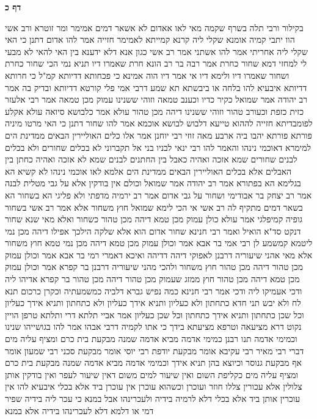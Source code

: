 \documentclass[12pt, openany]{book}
\newcommand{\sethebfont}{
\fontsize{10.5pt}{21.0pt} \selectfont
}
\newcommand{\twocol}[1]{
	{\sethebfont \begin{multicols}{2}
			#1
	\end{multicols}}	
}
\newcommand{\sectname}{}
\newcommand{\newsection}[1]{
	\addcontentsline{toc}{section}{#1}
	\renewcommand{\sectname}{#1}	
	\vspace{-\baselineskip}
	\begin{center}
		\textbf{%
\fontsize{16pt}{16pt}\selectfont
			#1}
	\end{center}
	\vspace{-\baselineskip}
	\nopagebreak
}
\begin{document}
\newsection{דף כ}
\twocol{בקילור ורבי תלה בשרף שקמה  מאי לאו אאדום 
לא אשאר דמים 
אמימר ומר זוטרא ורב אשי הוו יתבי קמיה אומנא שקלי ליה קרנא קמייתא לאמימר חזייה אמר להו  אדום דתנן כי האי  שקלי ליה אחריתי אמר להו  אשתני  אמר רב אשי  כגון אנא דלא ידענא בין האי להאי לא מבעי לי למחזי דמא
שחור כחרת אמר רבה בר רב הונא  חרת שאמרו דיו  תניא נמי הכי  שחור כחרת ושחור שאמרו דיו  ולימא דיו  אי אמר דיו הוה אמינא  כי פכחותא דדיותא קמ"ל כי חרותא דדיותא 
איבעיא להו  בלחה או ביבשתא  תא שמע  דרבי אמי פלי קורטא דדיותא ובדיק בה 
אמר רב יהודה אמר שמואל  כקיר כדיו וכענב טמאה וזוהי ששנינו עמוק מכן טמאה  אמר רבי אלעזר  כזית כזפת וכעורב טהור וזוהי ששנינו דיהה מכן טהור 
עולא אמר  כלבושא סיואה  עולא אקלע לפומבדיתא חזייה לההוא טייעא דלבוש לבושא אוכמא  אמר להו  שחור דתנן כי האי  מרטו מיניה פורתא פורתא יהבו ביה ארבע מאה זוזי 
רבי יוחנן אמר  אלו כלים האוליירין הבאים ממדינת הים  למימרא דאוכמי נינהו  והאמר להו רבי ינאי לבניו  בני אל תקברוני לא בכלים שחורים ולא בכלים לבנים  שחורים שמא אזכה ואהיה כאבל בין החתנים לבנים שמא לא אזכה ואהיה כחתן בין האבלים אלא בכלים האוליירין הבאים ממדינת הים 
אלמא לאו אוכמי נינהו  לא קשיא הא בגלימא הא בפתורא 
אמר רב יהודה אמר שמואל  וכולם אין בודקין אלא על גבי מטלית לבנה  אמר רב יצחק בר אבודימי  ושחור על גבי אדום 
אמר רב ירמיה מדפתי  ולא פליגי הא בשחור הא בשאר דמים  מתקיף לה רב אשי  אי הכי לימא שמואל חוץ משחור  אלא אמר רב אשי  בשחור גופיה קמיפלגי 
אמר עולא  כולן עמוק מכן טמא דיהה מכן טהור כשחור 
ואלא מאי שנא שחור דנקט  סד"א  הואיל ואמר רבי חנינא שחור אדום הוא אלא שלקה הילכך אפילו דיהה מכן נמי ליטמא קמשמע לן 
רבי אמי בר אבא אמר  וכולן עמוק מכן טמא דיהה מכן נמי טמא חוץ משחור  אלא מאי אהני שיעוריה דרבנן  לאפוקי דיהה דדיהה 
ואיכא דאמרי רמי בר אבא אמר  וכולן עמוק מכן טהור דיהה מכן טהור חוץ משחור  ולהכי מהני שיעוריה דרבנן 
בר קפרא אמר  וכולן עמוק מכן טמא דיהה מכן טהור  חוץ ממזג שעמוק מכן טהור דיהה מכן טהור  בר קפרא אדיהו ליה ודכי אעמיקו ליה ודכי  אמר רבי חנינא  כמה נפיש גברא דלביה כמשמעתיה
וכקרן כרכום תנא  לח ולא יבש 
תני חדא  כתחתון ולא כעליון ותניא אידך  כעליון ולא כתחתון ותניא אידך  כעליון וכל שכן כתחתון ותניא אידך  כתחתון וכל שכן כעליון 
אמר אביי  תלתא דרי ותלתא טרפן הויין
נקוט דרא מציעאה וטרפא מציעתא בידך 
כי אתו לקמיה דרבי אבהו אמר להו  בגושייהו שנינו
וכמימי אדמה תנו רבנן  כמימי אדמה מביא אדמה שמנה מבקעת בית כרם ומציף עליה מים דברי רבי מאיר  רבי עקיבא אומר  מבקעת יודפת  רבי יוסי אומר  מבקעת סכני  רבי שמעון אומר  אף מבקעת גנוסר וכיוצא בהן 
תניא אידך  וכמימי אדמה מביא אדמה שמנה מבקעת בית כרם ומציף עליה מים כקליפת השום ואין שיעור למים משום דאין שיעור לעפר  ואין בודקין אותן צלולין אלא עכורין  צללו חוזר ועוכרן  וכשהוא עוכרן אין עוכרן ביד אלא בכלי 
איבעיא להו  אין עוכרין אותן ביד אלא בכלי דלא לרמיה בידיה ולעכרינהו אבל במנא כי עכר ליה בידיה שפיר דמי או דלמא  דלא לעכרינהו בידיה אלא במנא 
}
\end{document}
